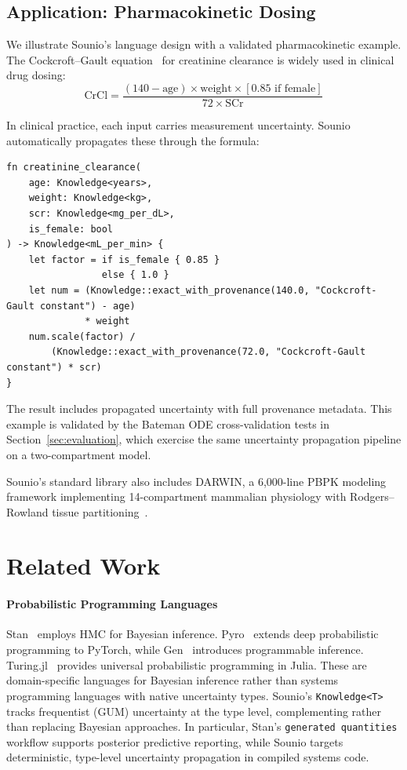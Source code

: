 \documentclass[journal]{IEEEtran}
\begin{document}
\subsection{Application: Pharmacokinetic Dosing}
\label{sec:applications}

We illustrate Sounio's language design with a validated pharmacokinetic
example. The Cockcroft--Gault equation~\cite{cockcroft1976prediction}
for creatinine clearance is widely used in clinical drug dosing:
\[
  \text{CrCl} = \frac{(140 - \text{age}) \times \text{weight} \times [0.85 \text{ if female}]}{72 \times \text{SCr}}
\]

In clinical practice, each input carries measurement uncertainty.
Sounio automatically propagates these through the formula:

\begin{lstlisting}[caption={GUM-compliant drug dosing}]
fn creatinine_clearance(
    age: Knowledge<years>,
    weight: Knowledge<kg>,
    scr: Knowledge<mg_per_dL>,
    is_female: bool
) -> Knowledge<mL_per_min> {
    let factor = if is_female { 0.85 }
                 else { 1.0 }
    let num = (Knowledge::exact_with_provenance(140.0, "Cockcroft-Gault constant") - age)
              * weight
    num.scale(factor) /
        (Knowledge::exact_with_provenance(72.0, "Cockcroft-Gault constant") * scr)
}
\end{lstlisting}

The result includes propagated uncertainty with full provenance metadata.
This example is validated by the Bateman ODE cross-validation tests in
Section~\ref{sec:evaluation}, which exercise the same uncertainty
propagation pipeline on a two-compartment model.

Sounio's standard library also includes DARWIN, a 6,000-line PBPK
modeling framework implementing 14-compartment mammalian physiology
with Rodgers--Rowland tissue partitioning~\cite{rodgers2005tissue}.

\section{Related Work}
\label{sec:related}

\paragraph{Probabilistic Programming Languages}
Stan~\cite{carpenter2017stan} employs HMC for Bayesian inference.
Pyro~\cite{bingham2019pyro} extends deep probabilistic programming to
PyTorch, while Gen~\cite{cusumano2019gen} introduces programmable
inference. Turing.jl~\cite{ge2018turing} provides universal probabilistic
programming in Julia. These are domain-specific languages for Bayesian
inference rather than systems programming languages with native
uncertainty types. Sounio's \texttt{Knowledge<T>} tracks frequentist
(GUM) uncertainty at the type level, complementing rather than replacing
Bayesian approaches. In particular, Stan's \texttt{generated quantities}
workflow supports posterior predictive reporting, while Sounio targets
deterministic, type-level uncertainty propagation in compiled systems code.
\end{document}
